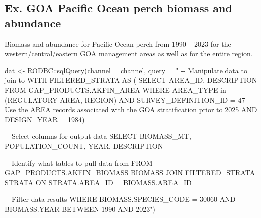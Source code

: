 \documentclass[
  letterpaper,
  oneside,
  open=any]{scrbook}
\newenvironment{Shaded}{\begin{snugshade}}{\end{snugshade}}
\newcommand{\AttributeTok}[1]{\textcolor[rgb]{0.40,0.45,0.13}{#1}}
\newcommand{\FunctionTok}[1]{\textcolor[rgb]{0.28,0.35,0.67}{#1}}
\newcommand{\NormalTok}[1]{\textcolor[rgb]{0.00,0.23,0.31}{#1}}
\newcommand{\OtherTok}[1]{\textcolor[rgb]{0.00,0.23,0.31}{#1}}
\newcommand{\SpecialCharTok}[1]{\textcolor[rgb]{0.37,0.37,0.37}{#1}}
\newcommand{\StringTok}[1]{\textcolor[rgb]{0.13,0.47,0.30}{#1}}
\begin{document}
\subsection{Ex. GOA Pacific Ocean perch biomass and
abundance}\label{ex.-goa-pacific-ocean-perch-biomass-and-abundance}

Biomass and abundance for Pacific Ocean perch from 1990 -- 2023 for the
western/central/eastern GOA management areas as well as for the entire
region.

\begin{Shaded}
\begin{Highlighting}[]
\NormalTok{dat }\OtherTok{\textless{}{-}}\NormalTok{ RODBC}\SpecialCharTok{::}\FunctionTok{sqlQuery}\NormalTok{(}\AttributeTok{channel =}\NormalTok{ channel, }
                       \AttributeTok{query =} 
                         \StringTok{"}
\StringTok{{-}{-} Manipulate data to join to}
\StringTok{WITH FILTERED\_STRATA AS (}
\StringTok{SELECT AREA\_ID, DESCRIPTION FROM GAP\_PRODUCTS.AKFIN\_AREA}
\StringTok{WHERE AREA\_TYPE in (\textquotesingle{}REGULATORY AREA\textquotesingle{}, \textquotesingle{}REGION\textquotesingle{}) }
\StringTok{AND SURVEY\_DEFINITION\_ID = 47}
\StringTok{{-}{-} Use the AREA records associated with the GOA stratification prior to 2025}
\StringTok{AND DESIGN\_YEAR = 1984)}

\StringTok{{-}{-} Select columns for output data}
\StringTok{SELECT }
\StringTok{BIOMASS\_MT,}
\StringTok{POPULATION\_COUNT, }
\StringTok{YEAR, }
\StringTok{DESCRIPTION}

\StringTok{{-}{-} Identify what tables to pull data from}
\StringTok{FROM GAP\_PRODUCTS.AKFIN\_BIOMASS BIOMASS}
\StringTok{JOIN FILTERED\_STRATA STRATA }
\StringTok{ON STRATA.AREA\_ID = BIOMASS.AREA\_ID}

\StringTok{{-}{-} Filter data results}
\StringTok{WHERE BIOMASS.SPECIES\_CODE = 30060}
\StringTok{AND BIOMASS.YEAR BETWEEN 1990 AND 2023"}\NormalTok{)}
\end{Highlighting}
\end{Shaded}
\end{document}
